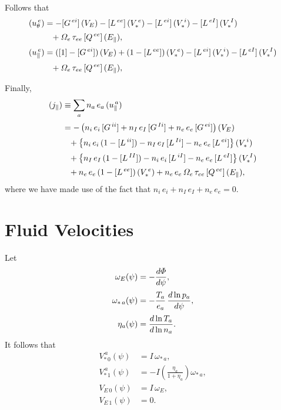 \documentclass[notitlepage,12pt]{article}
\begin{document}
Follows that
\begin{align}
(u_\theta^{\,e}) &=-[G^{\,ei}]\,(V_E)-[L^{\,ee}]\,(V_{\ast}^{\,e})- [L^{\,ei}]\,(V_{\ast}^{\,i}) -[L^{\,eI}]\,(V_\ast^{\,I}) 
\nonumber\\[0.5ex]
&\phantom{=}+ {\mit\Omega}_e\,\tau_{ee}\,[Q^{\,ee}]\,(E_\parallel),\\[0.5ex]
(u_\parallel^{\,e}) &= ([1]-[G^{\,ei}])\,(V_E) + (1-[L^{\,ee}])\,(V_{\ast}^{\,e}) - [L^{\,ei}]\,(V_{\ast}^{\,i}) -[L^{\,eI}]\,(V_\ast^{\,I})\nonumber\\[0.5ex]&\phantom{=}
+ {\mit\Omega}_e\,\tau_{ee}\,[Q^{\,ee}]\,(E_\parallel),
\end{align}

Finally,
\begin{align}
(j_\parallel) &\equiv \sum_a n_a\,e_a\,(u_\parallel^{\,a})\nonumber\\[0.5ex]
&=-\left(n_i\,e_i\,[G^{\,ii}]+n_I\,e_I\,[G^{\,Ii}]+n_e\,e_e\,[G^{\,ei}]\right)(V_E)
\nonumber\\[0.5ex]
&\phantom{=}+\left\{n_i\,e_i\,(1-[L^{\,ii}]) - n_I\,e_I\,[L^{\,Ii}] - n_e\,e_e\,[L^{\,ei}]\right\}(V_\ast^{\,i})\nonumber\\[0.5ex]
&\phantom{=}+\left\{n_I\,e_I\,(1-[L^{\,II}]) - n_i\,e_i\,[L^{\,iI}]-n_e\,e_e\,[L^{\,eI}]\right\}(V_\ast^{\,I})\nonumber\\[0.5ex]
&\phantom{=}+n_e\,e_e\,(1-[L^{\,ee}])\,(V_\ast^{\,e}) +n_e\,e_e\,{\mit\Omega}_e\,\tau_{ee}\,[Q^{\,ee}]\,(E_\parallel),
\end{align}
where we have made use of the fact that $n_i\,e_i+n_I\,e_I+n_e\,e_e=0$. 

\section{Fluid Velocities}
Let
\begin{align}
\omega_E(\psi) &=-\frac{d{\mit\Phi}}{d\psi},\\[0.5ex]
\omega_{\ast\,a}(\psi) &= -\frac{T_a}{e_a}\,\frac{d\ln p_a}{d\psi},\\[0.5ex]
\eta_a(\psi) &= \frac{d\ln T_a}{d\ln n_a}.
\end{align}
It follows that
\begin{align}
V_{\ast\,0}^{\,a}(\psi)&= I\,\omega_{\ast\,a},\\[0.5ex]
V_{\ast\,1}^{\,a}(\psi) &=-I\left(\frac{\eta_a}{1+\eta_a}\right)\omega_{\ast\,a},\\[0.5ex]
V_{E\,0}(\psi)&= I\,\omega_{E},\\[0.5ex]
V_{E\,1}(\psi) &=0.
\end{align}
\end{document}
